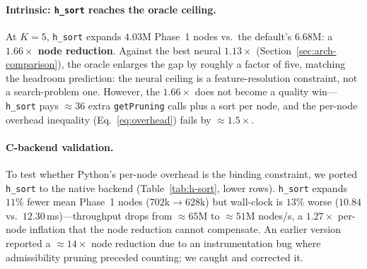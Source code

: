 \documentclass[graybox]{svmult}
\begin{document}
\begin{table}[!t]
\centering
\caption{Oracle \texttt{h\_sort} vs.\ lexicographic default. Python rows: 50 scrambles, seed 42, 5\,s budget ($K{=}5$). C rows: 50 cubes, seed 42, $K{=}1$ first-solution IDA*, 30\,s timeout. Frozen JSON: \texttt{results/h\_sort\_benchmark.json}, \texttt{results/h\_sort\_k1.json}, \texttt{results/hsort\_c\_backend.json}.}
\label{tab:h-sort}
\end{table}

\paragraph{Intrinsic: \texttt{h\_sort} reaches the oracle ceiling.}
At $K{=}5$, \texttt{h\_sort} expands $4.03$M Phase~1 nodes vs.\ the default's $6.68$M: a \textbf{$1.66\times$ node reduction}. Against the best neural $1.13\times$ (Section~\ref{sec:arch-comparison}), the oracle enlarges the gap by roughly a factor of five, matching the headroom prediction: the neural ceiling is a feature-resolution constraint, not a search-problem one. However, the $1.66\times$ does not become a quality win---\texttt{h\_sort} pays $\approx$$36$ extra \texttt{getPruning} calls plus a sort per node, and the per-node overhead inequality (Eq.~\ref{eq:overhead}) fails by $\approx$$1.5\times$.

\paragraph{C-backend validation.}
To test whether Python's per-node overhead is the binding constraint, we ported \texttt{h\_sort} to the native backend (Table~\ref{tab:h-sort}, lower rows). \texttt{h\_sort} expands $11\%$ fewer mean Phase~1 nodes ($702$k$\to$$628$k) but wall-clock is $13\%$ worse ($10.84$ vs.\ $12.30$\,ms)---throughput drops from $\approx$$65$M to $\approx$$51$M nodes/s, a $1.27\times$ per-node inflation that the node reduction cannot compensate. An earlier version reported a $\approx$$14\times$ node reduction due to an instrumentation bug where admissibility pruning preceded counting; we caught and corrected it.
\end{document}
